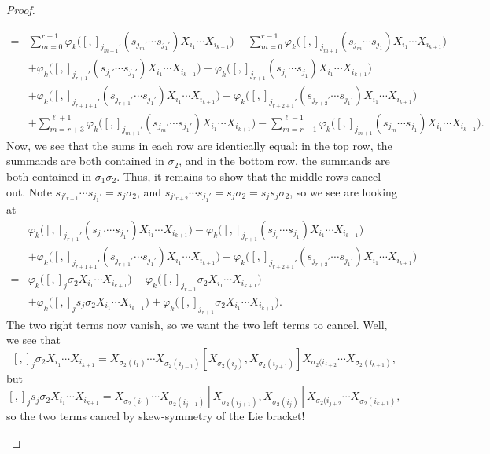 \documentclass[../notes.tex]{subfiles}
\begin{document}
\begin{proof}
\begin{itemize}
\begin{itemize}
\begin{align*}
				={}& \sum_{m=0}^{r-1}\varphi_k\big([,]_{j_{m+1}'}(s_{j_m'}\cdots s_{j_1'})X_{i_1}\cdots X_{i_{k+1}}\big)-\sum_{m=0}^{r-1}\varphi_k\big([,]_{j_{m+1}}(s_{j_m}\cdots s_{j_1})X_{i_1}\cdots X_{i_{k+1}}\big) \\
				&+\varphi_k\big([,]_{j_{r+1}'}(s_{j_r'}\cdots s_{j_1'})X_{i_1}\cdots X_{i_{k+1}}\big)-\varphi_k\big([,]_{j_{r+1}}(s_{j_r}\cdots s_{j_1})X_{i_1}\cdots X_{i_{k+1}}\big) \\
				&+\varphi_k\big([,]_{j_{r+1+1}'}(s_{j_{r+1}'}\cdots s_{j_1'})X_{i_1}\cdots X_{i_{k+1}}\big)+\varphi_k\big([,]_{j_{r+2+1}'}(s_{j_{r+2}'}\cdots s_{j_1'})X_{i_1}\cdots X_{i_{k+1}}\big) \\
				&+\sum_{m=r+3}^{\ell+1}\varphi_k\big([,]_{j_{m+1}'}(s_{j_m'}\cdots s_{j_1'})X_{i_1}\cdots X_{i_{k+1}}\big)-\sum_{m=r+1}^{\ell-1}\varphi_k\big([,]_{j_{m+1}}(s_{j_m}\cdots s_{j_1})X_{i_1}\cdots X_{i_{k+1}}\big).
			\end{align*}
			Now, we see that the sums in each row are identically equal: in the top row, the summands are both contained in $\sigma_2$, and in the bottom row, the summands are both contained in $\sigma_1\sigma_2$. Thus, it remains to show that the middle rows cancel out. Note $s_{j'_{r+1}}\cdots s_{j_1'}=s_j\sigma_2$, and $s_{j'_{r+2}}\cdots s_{j_1'}=s_j\sigma_2=s_js_j\sigma_2$, so we see are looking at
			\begin{align*}
				& \varphi_k\big([,]_{j_{r+1}'}(s_{j_r'}\cdots s_{j_1'})X_{i_1}\cdots X_{i_{k+1}}\big)-\varphi_k\big([,]_{j_{r+1}}(s_{j_r}\cdots s_{j_1})X_{i_1}\cdots X_{i_{k+1}}\big) \\
				&+\varphi_k\big([,]_{j_{r+1+1}'}(s_{j_{r+1}'}\cdots s_{j_1'})X_{i_1}\cdots X_{i_{k+1}}\big)+\varphi_k\big([,]_{j_{r+2+1}'}(s_{j_{r+2}'}\cdots s_{j_1'})X_{i_1}\cdots X_{i_{k+1}}\big) \\
				={}& \varphi_k\big([,]_{j}\sigma_2X_{i_1}\cdots X_{i_{k+1}}\big)-\varphi_k\big([,]_{j_{r+1}}\sigma_2X_{i_1}\cdots X_{i_{k+1}}\big) \\
				&+\varphi_k\big([,]_{j}s_j\sigma_2X_{i_1}\cdots X_{i_{k+1}}\big)+\varphi_k\big([,]_{j_{r+1}}\sigma_2X_{i_1}\cdots X_{i_{k+1}}\big).
			\end{align*}
			The two right terms now vanish, so we want the two left terms to cancel. Well, we see that
			\[[,]_{j}\sigma_2X_{i_1}\cdots X_{i_{k+1}}=X_{\sigma_2(i_1)}\cdots X_{\sigma_2(i_{j-1})}[X_{\sigma_2(i_j)},X_{\sigma_2(i_{j+1})}]X_{\sigma_2(i_{j+2}}\cdots X_{\sigma_2(i_{k+1})},\]
			but
			\[[,]_{j}s_j\sigma_2X_{i_1}\cdots X_{i_{k+1}}=X_{\sigma_2(i_1)}\cdots X_{\sigma_2(i_{j-1})}[X_{\sigma_2(i_{j+1})},X_{\sigma_2(i_{j})}]X_{\sigma_2(i_{j+2}}\cdots X_{\sigma_2(i_{k+1})},\]
			so the two terms cancel by skew-symmetry of the Lie bracket!


\end{itemize}
\end{itemize}
\end{proof}
\end{document}
